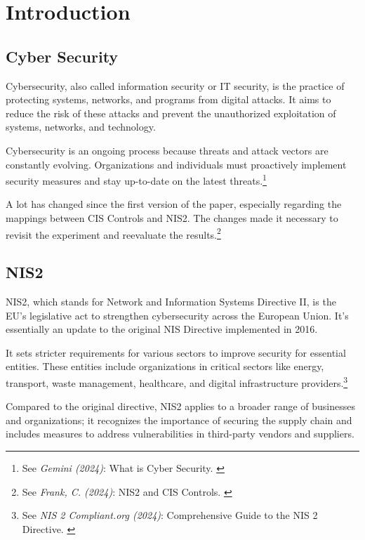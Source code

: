 %
%

\pagebreak
\section{Introduction}

\onehalfspacing

\subsection{Cyber Security}

Cybersecurity, also called information security or IT security, is the practice of protecting systems, networks, and programs from digital attacks. It aims to reduce the risk of these attacks and prevent the unauthorized exploitation of systems, networks, and technology.

Cybersecurity is an ongoing process because threats and attack vectors are constantly evolving. Organizations and individuals must proactively implement security measures and stay up-to-date on the latest threats.\footnote{See \textit{Gemini (2024)}: What is Cyber Security. \cite{bardCybersec}}

A lot has changed since the first version of the paper, especially regarding the mappings between CIS Controls and NIS2. The changes made it necessary to revisit the experiment and reevaluate the results.\footnote{See \textit{Frank, C. (2024)}: NIS2 and CIS Controls. \cite{previousPaper}}

\subsection{NIS2}

NIS2, which stands for Network and Information Systems Directive II, is the EU's legislative act to strengthen cybersecurity across the European Union. It's essentially an update to the original NIS Directive implemented in 2016.

It sets stricter requirements for various sectors to improve security for essential entities. These entities include organizations in critical sectors like energy, transport, waste management, healthcare, and digital infrastructure providers.\footnote{See \textit{NIS 2 Compliant.org (2024)}: Comprehensive Guide to the NIS 2 Directive. \cite{nisGuide}}

Compared to the original directive, NIS2 applies to a broader range of businesses and organizations; it recognizes the importance of securing the supply chain and includes measures to address vulnerabilities in third-party vendors and suppliers.

